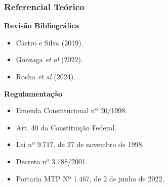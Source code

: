 \documentclass[11pt]{beamer}
\begin{document}
    \begin{frame}

        \frametitle{Referencial Teórico}

            \textbf{Revisão Bibliográfica}

                \begin{itemize}
                    \item Castro e Silva (2019).
                    \item Gonzaga \textit{et al} (2022).
                    \item Rocha \textit{et al} (2024).
                \end{itemize}

            \bigskip

            \textbf{Regulamentação}

                \begin{itemize}
                    \item Emenda Constitucional nº 20/1998.
                    \item Art. 40 da  Constituição Federal.
                    \item Lei nº 9.717, de 27 de novembro de 1998.
                    \item Decreto nº 3.788/2001.
                    \item Portaria MTP Nº 1.467, de 2 de junho de 2022.
                \end{itemize}

    \end{frame}
\end{document}
